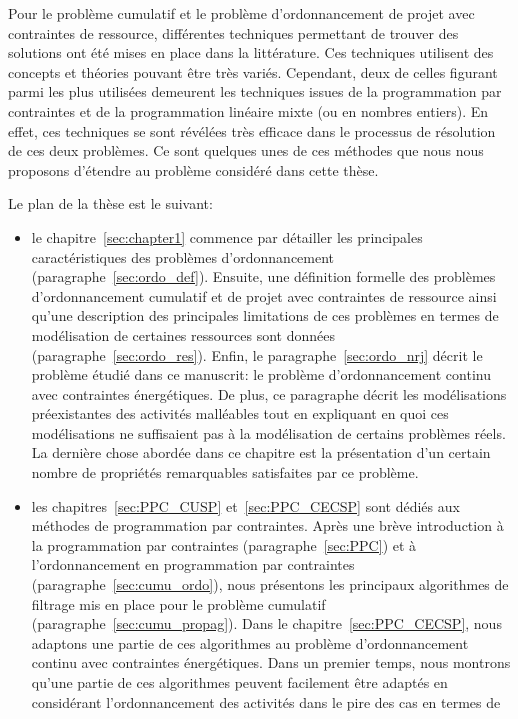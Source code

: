 Pour le problème cumulatif et le problème d'ordonnancement de projet
avec contraintes de ressource, différentes techniques permettant de
trouver des solutions ont été mises en place dans la littérature. Ces
techniques utilisent des concepts et théories pouvant être très
variés. Cependant, deux de celles figurant parmi les plus utilisées
demeurent les techniques issues de la programmation par contraintes et
de la programmation linéaire mixte (ou en nombres entiers). En effet,
ces techniques se sont révélées très efficace dans le processus de
résolution de ces deux problèmes. Ce sont quelques unes de ces
méthodes que nous nous proposons d'étendre au problème considéré dans
cette thèse.

Le plan de la thèse est le suivant: 
\begin{itemize}
\item le chapitre~\ref{sec:chapter1} commence par détailler les
principales caractéristiques des problèmes d'ordonnancement
(paragraphe~\ref{sec:ordo_def}). Ensuite, une définition formelle des
problèmes d'ordonnancement cumulatif et de projet
avec contraintes de ressource ainsi qu'une description des principales
limitations de ces problèmes en termes de modélisation de certaines
ressources sont données
(paragraphe~\ref{sec:ordo_res}).  Enfin, le
paragraphe~\ref{sec:ordo_nrj} décrit le problème étudié dans ce
manuscrit: le problème d'ordonnancement continu avec contraintes
énergétiques. De plus, ce paragraphe décrit les modélisations
préexistantes des activités malléables tout en expliquant en quoi ces
modélisations ne suffisaient pas à la modélisation de certains problèmes
réels. La dernière chose abordée dans ce chapitre est la présentation
d'un certain nombre de propriétés remarquables satisfaites par ce problème.
\item les chapitres~\ref{sec:PPC_CUSP} et~\ref{sec:PPC_CECSP} sont
  dédiés aux méthodes de programmation par
  contraintes. Après une brève introduction à la programmation par
  contraintes (paragraphe~\ref{sec:PPC}) et à l'ordonnancement en
  programmation par contraintes (paragraphe~\ref{sec:cumu_ordo}), nous
  présentons les principaux algorithmes de filtrage mis en place pour
  le problème cumulatif (paragraphe~\ref{sec:cumu_propag}). Dans le
  chapitre~\ref{sec:PPC_CECSP}, nous adaptons une partie de ces
  algorithmes au problème d'ordonnancement continu avec contraintes
  énergétiques. Dans un premier temps, nous montrons qu'une partie de
  ces algorithmes peuvent facilement être adaptés en considérant
  l'ordonnancement des activités dans le pire des cas en termes de

\end{itemize}
